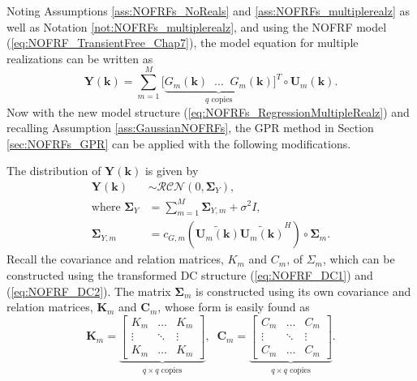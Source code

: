 Noting Assumptions \ref{ass:NOFRFs_NoReals} and \ref{ass:NOFRFs_multiplerealz} as well as Notation \ref{not:NOFRFs_multiplerealz}, and using the NOFRF model (\ref{eq:NOFRF_TransientFree_Chap7}), the model equation for multiple realizations can be written as
\begin{equation}
\mathbf{Y}(\mathbf{k}) = \sum_{m=1}^M \Big[ \underbrace{G_m(\mathbf{k}) \; \; \hdots \; \; G_m(\mathbf{k})}_{q \textrm{ copies}} \Big]^T \circ \mathbf{U}_m(\mathbf{k}).
\label{eq:NOFRFs_RegressionMultipleRealz}
\end{equation}
Now with the new model structure (\ref{eq:NOFRFs_RegressionMultipleRealz}) and recalling Assumption \ref{ass:GaussianNOFRFs}, the GPR method in Section \ref{sec:NOFRFs_GPR} can be applied with the following modifications.

The distribution of $\mathbf{Y}(\mathbf{k})$ is given by
\begin{equation}
\begin{split}
\label{eq:MultipleOutputSpectrumThm}
\mathbf{Y}(\mathbf{k}) &\sim \mathcal{RCN}(0,\mathbf{\Sigma}_Y), \\
\text{where } \mathbf{\Sigma}_Y &= \sum_{m=1}^{M} \mathbf{\Sigma}_{Y,m} + \sigma^2 I, \\
\mathbf{\Sigma}_{Y,m} &= c_{G,m} (\widetilde{\mathbf{U}_m(\mathbf{k})} \widetilde{\mathbf{U}_m(\mathbf{k})}^H)  \circ \mathbf{\Sigma}_m.
\end{split}
\end{equation}
Recall the covariance and relation matrices, $K_m$ and $C_m$, of $\Sigma_m$, which can be constructed using the transformed DC structure (\ref{eq:NOFRF_DC1}) and (\ref{eq:NOFRF_DC2}). The matrix $\mathbf{\Sigma}_m$ is constructed using its own covariance and relation matrices, $\mathbf{K}_m$ and $\mathbf{C}_m$, whose form is easily found as
\begin{equation}
\mathbf{K}_m = \underbrace{\begin{bmatrix} K_m & \hdots & K_m \\ \vdots & \ddots & \vdots \\ K_m & \hdots & K_m \end{bmatrix}}_{q \times q \textrm{ copies}}, \; \; \mathbf{C}_m = \underbrace{\begin{bmatrix} C_m & \hdots & C_m \\ \vdots & \ddots & \vdots \\ C_m & \hdots & C_m \end{bmatrix}}_{q \times q \textrm{ copies}}.
\end{equation}

